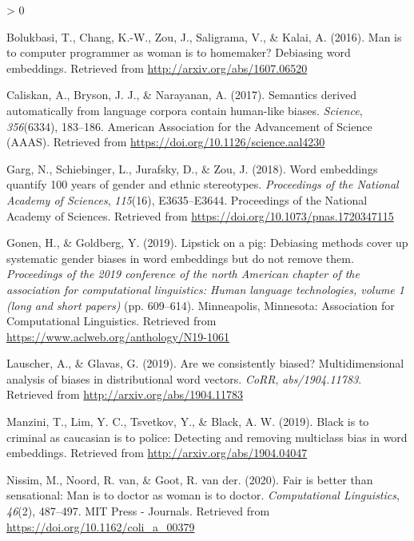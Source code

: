\documentclass[
  10pt,
  dvipsnames,enabledeprecatedfontcommands]{scrartcl}
\newlength{\cslhangindent}
\newenvironment{CSLReferences}[2] %
 {%
  \setlength{\parindent}{0pt}
  \ifodd #1 \everypar{\setlength{\hangindent}{\cslhangindent}}\ignorespaces\fi
  \ifnum #2 > 0
  \setlength{\parskip}{#2\baselineskip}
  \fi
 }%
 {}
\begin{document}
\hypertarget{refs}{}
\begin{CSLReferences}{1}{0}
\leavevmode\hypertarget{ref-bolukbasi2016man}{}%
Bolukbasi, T., Chang, K.-W., Zou, J., Saligrama, V., \& Kalai, A.
(2016). Man is to computer programmer as woman is to homemaker?
Debiasing word embeddings. Retrieved from
\url{http://arxiv.org/abs/1607.06520}

\leavevmode\hypertarget{ref-Caliskan2017semanticsBiases}{}%
Caliskan, A., Bryson, J. J., \& Narayanan, A. (2017). Semantics derived
automatically from language corpora contain human-like biases.
\emph{Science}, \emph{356}(6334), 183--186. American Association for the
Advancement of Science ({AAAS}). Retrieved from
\url{https://doi.org/10.1126/science.aal4230}

\leavevmode\hypertarget{ref-Garg2018years}{}%
Garg, N., Schiebinger, L., Jurafsky, D., \& Zou, J. (2018). Word
embeddings quantify 100 years of gender and ethnic stereotypes.
\emph{Proceedings of the National Academy of Sciences}, \emph{115}(16),
E3635--E3644. Proceedings of the National Academy of Sciences. Retrieved
from \url{https://doi.org/10.1073/pnas.1720347115}

\leavevmode\hypertarget{ref-Gonen2019lipstick}{}%
Gonen, H., \& Goldberg, Y. (2019). Lipstick on a pig: {D}ebiasing
methods cover up systematic gender biases in word embeddings but do not
remove them. \emph{Proceedings of the 2019 conference of the north
{A}merican chapter of the association for computational linguistics:
Human language technologies, volume 1 (long and short papers)} (pp.
609--614). Minneapolis, Minnesota: Association for Computational
Linguistics. Retrieved from
\url{https://www.aclweb.org/anthology/N19-1061}

\leavevmode\hypertarget{ref-Lauscher2019multidimensional}{}%
Lauscher, A., \& Glavas, G. (2019). Are we consistently biased?
Multidimensional analysis of biases in distributional word vectors.
\emph{CoRR}, \emph{abs/1904.11783}. Retrieved from
\url{http://arxiv.org/abs/1904.11783}

\leavevmode\hypertarget{ref-Manzini2019blackToCriminal}{}%
Manzini, T., Lim, Y. C., Tsvetkov, Y., \& Black, A. W. (2019). Black is
to criminal as caucasian is to police: Detecting and removing multiclass
bias in word embeddings. Retrieved from
\url{http://arxiv.org/abs/1904.04047}

\leavevmode\hypertarget{ref-Nissim2020fair}{}%
Nissim, M., Noord, R. van, \& Goot, R. van der. (2020). Fair is better
than sensational: Man is to doctor as woman is to doctor.
\emph{Computational Linguistics}, \emph{46}(2), 487--497. {MIT} Press -
Journals. Retrieved from \url{https://doi.org/10.1162/coli_a_00379}


\end{CSLReferences}
\end{document}
